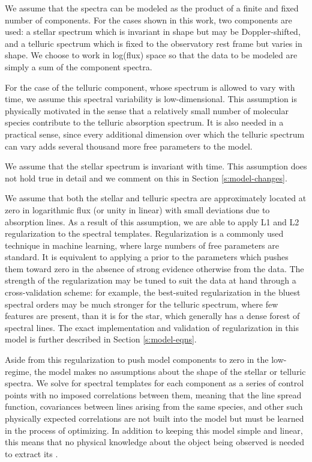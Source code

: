 \documentclass[twocolumn]{aastex62}
\begin{document}
We assume that the spectra can be modeled as the product of a finite and fixed number of components.
For the cases shown in this work, two components are used: a stellar spectrum which is invariant in shape but may be Doppler-shifted, and a telluric spectrum which is fixed to the observatory rest frame but varies in shape. 
We choose to work in log(flux) space so that the data to be modeled are simply a sum of the component spectra.

For the case of the telluric component, whose spectrum is allowed to vary with time, we assume this spectral variability is low-dimensional. 
This assumption is physically motivated in the sense that a relatively small number of molecular species contribute to the telluric absorption spectrum. 
It is also needed in a practical sense, since every additional dimension over which the telluric spectrum can vary adds several thousand more free parameters to the model.

We assume that the stellar spectrum is invariant with time. 
This assumption does not hold true in detail and we comment on this in Section \ref{s:model-changes}. 

We assume that both the stellar and telluric spectra are approximately located at zero in logarithmic flux (or unity in linear) with small deviations due to absorption lines. 
As a result of this assumption, we are able to apply L1 and L2 regularization to the spectral templates. 
Regularization is a commonly used technique in machine learning, where large numbers of free parameters are standard. 
It is equivalent to applying a prior to the parameters which pushes them toward zero in the absence of strong evidence otherwise from the data. 
The strength of the regularization may be tuned to suit the data at hand through a cross-validation scheme: for example, the best-suited regularization in the bluest spectral orders may be much stronger for the telluric spectrum, where few features are present, than it is for the star, which generally has a dense forest of spectral lines. 
The exact implementation and validation of regularization in this model is further described in Section \ref{s:model-eqns}.

Aside from this regularization to push model components to zero in the low-\SNR regime, the model makes no assumptions about the shape of the stellar or telluric spectra. 
We solve for spectral templates for each component as a series of control points with no imposed correlations between them, meaning that the line spread function, covariances between lines arising from the same species, and other such physically expected correlations are not built into the model but must be learned in the process of optimizing. 
In addition to keeping this model simple and linear, this means that no physical knowledge about the object being observed is needed to extract its \RVs.
\end{document}
